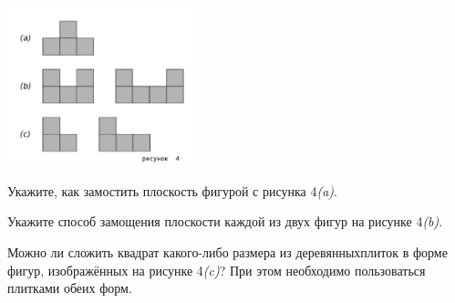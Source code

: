 ﻿
\vspace{-0.7cm}
\centerline{\includegraphics[width=5.5cm]{stats/2018/images/plane-park}}

\begin{enumerate}
\itA Укажите, как замостить плоскость фигурой с рисунка 4{\itshape (a)}.

\itB Укажите способ замощения плоскости каждой из двух фигур на рисунке 4{\itshape (b)}.

\itC Можно ли сложить квадрат какого-либо размера из деревянных\linebreak плиток в форме фигур, изображённых на рисунке 4{\itshape (c)}? При этом необходимо пользоваться плитками обеих форм.
\end{enumerate}